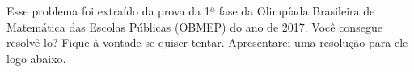 \documentclass[a4paper, 12pt]{article}
\begin{document}
\noindent 


\noindent Esse problema foi extraído da prova da 1ª fase da Olimpíada Brasileira de Matemática das Escolas Públicas (OBMEP) do ano de 2017. Você consegue resolvê-lo? Fique à vontade se quiser tentar. Apresentarei uma resolução para ele logo abaixo. 


\noindent %

            
        
    
    
    
\end{document}
